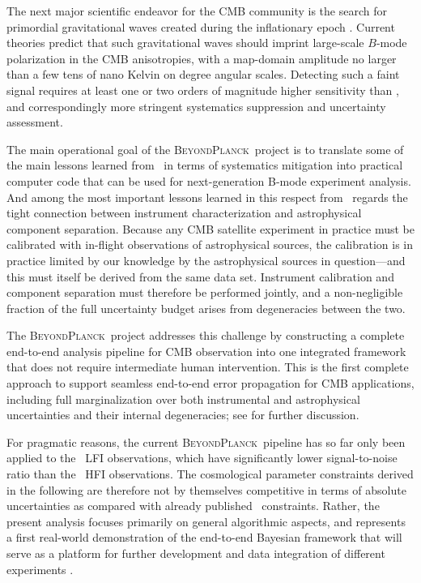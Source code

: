 \documentclass[twocolumn]{aa}
\newcommand{\BP}{\textsc{BeyondPlanck}}
\begin{document}
The next major scientific endeavor for the CMB community is the
search for primordial gravitational waves created during the
inflationary epoch \citep[e.g.,][]{kamionkowski:2016}. Current theories predict that such gravitational
waves should imprint large-scale $B$-mode polarization in the CMB
anisotropies, with a map-domain amplitude no larger than a few tens of
nano Kelvin on degree angular scales. Detecting such a faint signal
requires at least one or two orders of magnitude higher sensitivity
than \Planck, and correspondingly more stringent systematics
suppression and uncertainty assessment.

The main operational goal of the \BP\ project \citep{bp01} is to
translate some of the main lessons learned from \Planck\ in terms of
systematics mitigation into practical computer code that can be used
for next-generation B-mode experiment analysis. And among the most
important lessons learned in this respect from \Planck\ regards the
tight connection between instrument characterization and astrophysical
component separation. Because any CMB satellite experiment in practice
must be calibrated with in-flight observations of astrophysical
sources, the calibration is in practice limited by our knowledge by
the astrophysical sources in question---and this must itself be
derived from the same data set. Instrument calibration and component
separation must therefore be performed jointly, and a non-negligible
fraction of the full uncertainty budget arises from degeneracies
between the two.

The \BP\ project addresses this challenge by constructing a complete
end-to-end analysis pipeline for CMB observation into one integrated
framework that does not require intermediate human intervention. This
is the first complete approach to support seamless end-to-end error
propagation for CMB applications, including full marginalization over
both instrumental and astrophysical uncertainties and their
internal degeneracies; see \citet{bp01,bp11} for further discussion.

For pragmatic reasons, the current \BP\ pipeline has so far only been
applied to the \Planck\ LFI observations, which have significantly
lower signal-to-noise ratio than the \Planck\ HFI observations. The
cosmological parameter constraints derived in the following are
therefore not by themselves competitive in terms of absolute
uncertainties as compared with already published
\Planck\ constraints. Rather, the present analysis focuses primarily
on general algorithmic aspects, and represents a first real-world
demonstration of the end-to-end Bayesian framework that will serve as
a platform for further development and data integration of different
experiments \citep{bp05}.
\end{document}

